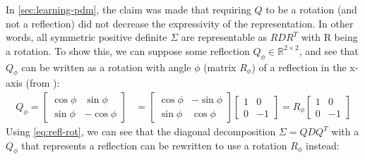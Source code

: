 \documentclass[a4paper, 12pt]{report}
\begin{document}
In \ref{sec:learning-pdm}, the claim was made that requiring $Q$ to be a rotation (and not a reflection) did not decrease the expressivity of the representation. In other words, all symmetric positive definite $\Sigma$ are representable as $RDR^T$ with R being a rotation. To show this, we can suppose some reflection $Q_\phi\in \mathbb{R}^{2\times 2}$, and see that $Q_\phi$ can be written as a rotation with angle $\phi$ (matrix $R_\phi$) of a reflection in the x-axis (from \cite{poole2015linear}):
\begin{align}
	Q_\phi=\begin{bmatrix}
		\cos \phi  &  \sin \phi  \\
		\sin \phi  &  -\cos \phi
	\end{bmatrix} &= \begin{bmatrix}
		\cos \phi  &  -\sin \phi  \\
		\sin \phi  &  \cos \phi
	\end{bmatrix} \begin{bmatrix}
		1  &  0  \\
		0  &  -1
	\end{bmatrix} = R_\phi \begin{bmatrix}
		1  &  0  \\
		0  &  -1
	\end{bmatrix} \label{eq:refl-rot}
\end{align}
Using \ref{eq:refl-rot}, we can see that the diagonal decomposition $\Sigma = QDQ^T$ with a $Q_\phi$ that represents a reflection can be rewritten to use a rotation $R_\phi$ instead:
\end{document}
